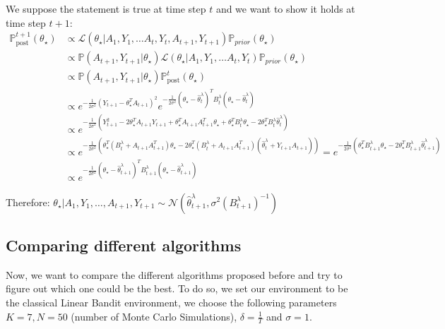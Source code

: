 \medskip
We suppose the statement is true at time step $t$ and we want to show it holds at time step $t+1$:
\begin{align*}
    \mathbb{P}_{\text{post}}^{t+1}(\theta_{\star}) & \propto \mathcal{L}(\theta_{\star} | A_1, Y_1, \dots A_t, Y_t, A_{t+1}, Y_{t+1}) \mathbb{P}_{prior}(\theta_{\star})\\
    & \propto \mathbb{P}(A_{t+1}, Y_{t+1} | \theta_{\star}) \mathcal{L}(\theta_{\star} | A_1, Y_1, \dots A_t, Y_t) \mathbb{P}_{prior}(\theta_{\star}) \\
    & \propto \mathbb{P}(A_{t+1}, Y_{t+1} | \theta_{\star}) \mathbb{P}_{\text{post}}^{t}(\theta_{\star}) \\
    & \propto e^{-\frac{1}{2\sigma^2} (Y_{t+1} - \theta_{\star}^TA_{t+1})^2} e^{-\frac{1}{2\sigma^2}(\theta_{\star} - \hat\theta_t^{\lambda})^T B_t^{\lambda}(\theta_{\star} - \hat\theta_t^{\lambda}) }\\
    & \propto e^{-\frac{1}{2\sigma^2}(Y_{t+1}^2 -2\theta_{\star}^TA_{t+1}Y_{t+1} + \theta_{\star}^TA_{t+1}A_{t+1}^T\theta_{\star} + \theta_{\star}^T B_t^{\lambda}\theta_{\star} - 2\theta_{\star}^T B_t^{\lambda}\hat\theta_t^{\lambda})}\\
    & \propto e^{-\frac{1}{2\sigma^2}(\theta_{\star}^T (B_t^{\lambda} + A_{t+1}A_{t+1}^T) \theta_{\star} -2 \theta_{\star}^T (B_t^{\lambda} + A_{t+1}A_{t+1}^T) (\hat\theta_{t}^{\lambda} + Y_{t+1}A_{t+1})  )} = e^{-\frac{1}{2\sigma^2}(\theta_{\star}^T B_{t+1}^{\lambda}  \theta_{\star} -2 \theta_{\star}^T B_{t+1}^{\lambda} \hat\theta_{t+1}^{\lambda})}\\
    & \propto e^{-\frac{1}{2\sigma^2}{(\theta_{\star} - \hat\theta_{t+1}^{\lambda})}^T B_{t+1}^{\lambda}  (\theta_{\star} - \hat\theta_{t+1}^{\lambda})}
\end{align*}

Therefore:
$\theta_{\star}|A_1, Y_1, \dots, A_{t+1}, Y_{t+1} \sim \mathcal{N}(\hat\theta_{t+1}^{\lambda}, \sigma^2{(B_{t+1}^{\lambda})}^{-1})$

\subsection{Comparing different algorithms}
Now, we want to compare the different algorithms proposed before and try to figure out which one could be the best.
To do so, we set our environment to be the classical Linear Bandit environment, we choose the following parameters $K=7, N=50$ (number of Monte Carlo Simulations), $\delta = \frac{1}{T}$ and $\sigma = 1$.

